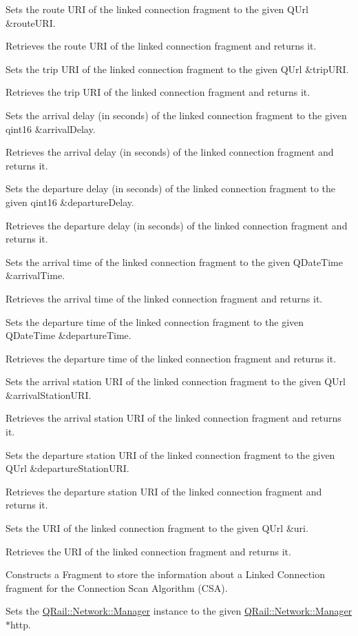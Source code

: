 Sets the route U\+RI of the linked connection fragment to the given Q\+Url \&route\+U\+RI.

Retrieves the route U\+RI of the linked connection fragment and returns it.

Sets the trip U\+RI of the linked connection fragment to the given Q\+Url \&trip\+U\+RI.

Retrieves the trip U\+RI of the linked connection fragment and returns it.

Sets the arrival delay (in seconds) of the linked connection fragment to the given qint16 \&arrival\+Delay.

Retrieves the arrival delay (in seconds) of the linked connection fragment and returns it.

Sets the departure delay (in seconds) of the linked connection fragment to the given qint16 \&departure\+Delay.

Retrieves the departure delay (in seconds) of the linked connection fragment and returns it.

Sets the arrival time of the linked connection fragment to the given Q\+Date\+Time \&arrival\+Time.

Retrieves the arrival time of the linked connection fragment and returns it.

Sets the departure time of the linked connection fragment to the given Q\+Date\+Time \&departure\+Time.

Retrieves the departure time of the linked connection fragment and returns it.

Sets the arrival station U\+RI of the linked connection fragment to the given Q\+Url \&arrival\+Station\+U\+RI.

Retrieves the arrival station U\+RI of the linked connection fragment and returns it.

Sets the departure station U\+RI of the linked connection fragment to the given Q\+Url \&departure\+Station\+U\+RI.

Retrieves the departure station U\+RI of the linked connection fragment and returns it.

Sets the U\+RI of the linked connection fragment to the given Q\+Url \&uri.

Retrieves the U\+RI of the linked connection fragment and returns it.

Constructs a Fragment to store the information about a Linked Connection fragment for the Connection Scan Algorithm (C\+SA).

Sets the \mbox{\hyperlink{classQRail_1_1Network_1_1Manager}{Q\+Rail\+::\+Network\+::\+Manager}} instance to the given \mbox{\hyperlink{classQRail_1_1Network_1_1Manager}{Q\+Rail\+::\+Network\+::\+Manager}} $\ast$http.

